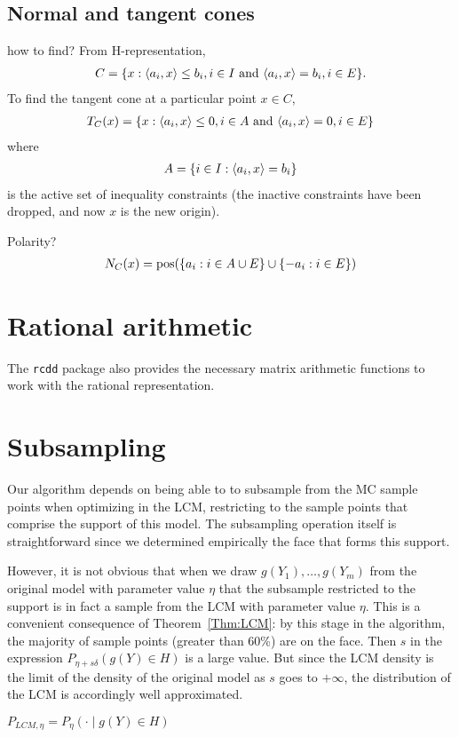 
\subsection{Normal and tangent cones}
how to find?
From H-representation,
\begin{align*}
	C = \{ x: \langle a_i, x \rangle \leq b_i, i \in I \text{ and } 
				\langle a_i, x \rangle = b_i, i \in E \}.
\end{align*}
To find the tangent cone at a particular point $x \in C$,
\begin{align*}
	T_C(x) = \{ x: \langle a_i, x \rangle \leq 0, i \in A \text{ and } 
				\langle a_i, x \rangle = 0, i \in E \}
\end{align*}
where 
\begin{align*}
	A = \{ i \in I: \langle a_i, x \rangle = b_i \}
\end{align*}
is the active set of inequality constraints (the inactive constraints have been
 dropped, and now $x$ is the new origin).

Polarity?
\begin{align*}
	N_C(x) = \operatorname{pos}( \{ a_i: i \in A \cup E \} \cup \{ -a_i: i \in E \} )
\end{align*}

\section{Rational arithmetic}
The \texttt{rcdd} package also provides the necessary matrix arithmetic functions to 
work with the rational representation.

\section{Subsampling}
Our algorithm depends on being able to to subsample from the MC sample points when 
optimizing in the LCM, restricting to the sample points that comprise the support of 
this model.  The subsampling operation itself is straightforward since we determined 
empirically the face that forms this support.  

However, it is not obvious that when we draw $g(Y_1), \ldots, g(Y_m)$ from the 
original model with parameter value $\eta$ that the subsample restricted to the 
support is in fact a sample from the LCM with parameter value $\eta$.  This is a 
convenient consequence of Theorem~\ref{Thm:LCM}: by this stage in the algorithm, the 
majority of sample points (greater than 60\%) are on the face.  Then $s$ in the 
expression $P_{\eta + s \delta}(g(Y) \in H)$ is a large value.  But since the LCM 
density is the limit of the density of the original model as $s$ goes to $+\infty$, 
the distribution of the LCM is accordingly well approximated.  

$P_{LCM, \eta} = P_\eta( \cdot \mid g(Y) \in H )$


